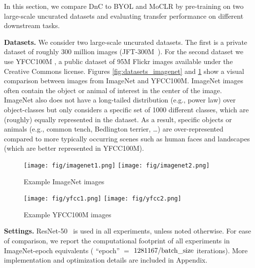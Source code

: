 \documentclass[final]{cvpr}
\newcommand\baseline{MoCLR}
\newcommand\jft{JFT-300M}
\begin{document}
In this section, we compare DnC to BYOL and \baseline{} by pre-training on two large-scale uncurated datasets and evaluating transfer performance on different downstream tasks.

\noindent \textbf{Datasets.} We consider two large-scale uncurated  datasets. The first is a private dataset of roughly 300 million images (\jft{}~\cite{sun2017revisiting}). For the second dataset we use YFCC100M \cite{thomee2016yfcc100m}, a public dataset of 95M Flickr images available under the Creative Commons license. Figures \ref{fig:datasets_imagenet} and \ref{fig:datasets_yfcc} show a visual comparison between images from ImageNet and YFCC100M. ImageNet images often contain the object or animal of interest in the center of the image. ImageNet also does not have a long-tailed distribution (e.g., power law) over object-classes but only considers a specific set of 1000 different classes, which are (roughly) equally represented in the dataset. As a result, specific objects or animals (e.g., common tench, Bedlington terrier, \dots) are over-represented compared to more typically occurring scenes such as human faces and landscapes (which are better represented in YFCC100M). 

\begin{figure}[t]
  \centering
  \texttt{[image: fig/imagenet1.png]}
  \texttt{[image: fig/imagenet2.png]}
  \caption{\label{fig:datasets_imagenet} Example ImageNet images}
  \texttt{[image: fig/yfcc1.png]}
  \texttt{[image: fig/yfcc2.png]}
  \caption{\label{fig:datasets_yfcc} Example YFCC100M images}
\end{figure}

\noindent \textbf{Settings.} ResNet-50~\cite{he2016deep} is used in all experiments, unless noted otherwise. For ease of comparison, we report the computational footprint of all experiments in ImageNet-epoch equivalents ( ``epoch'' $=$ $1281167/\text{batch\textunderscore size}$ iterations). More implementation and optimization details are included in Appendix.
\end{document}
